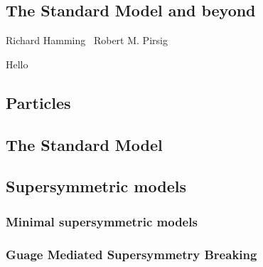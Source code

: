 \begin{singlespacing}
\chapter{The Standard Model and beyond}
\label{chapter:theory}
%
\begin{epigraphs}
%
{Richard Hamming~\cite{hamming1980unreasonable}}
%
{Robert M. Pirsig~\cite{pirsig1999zen}}
\end{epigraphs}
\end{singlespacing}


Hello

\section{Particles}

\section{The Standard Model}

\section{Supersymmetric models}

\subsection{Minimal supersymmetric models}

\subsection{Guage Mediated Supersymmetry Breaking}

